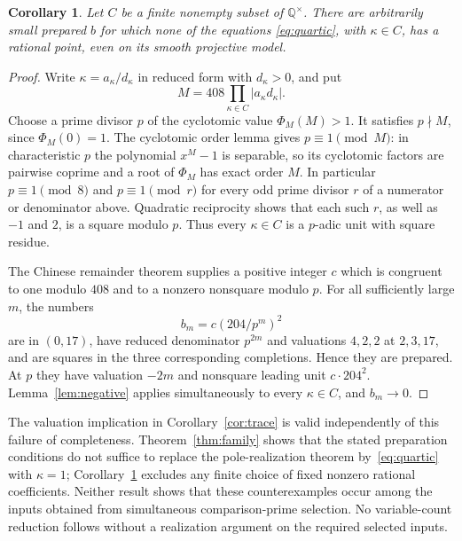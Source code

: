 \documentclass[11pt,a4paper]{article}
\newtheorem{corollary}[theorem]{Corollary}
\theoremstyle{definition}\newtheorem{definition}[theorem]{Definition}
\newcommand{\Q}{\mathbb Q}\newcommand{\Z}{\mathbb Z}
\begin{document}
\begin{corollary}\label{cor:finite}
Let $C$ be a finite nonempty subset of $\Q^\times$. There are
arbitrarily small prepared $b$ for which none of the equations
\eqref{eq:quartic}, with $\kappa\in C$, has a rational point,
even on its smooth projective model.
\end{corollary}
\begin{proof}
Write $\kappa=a_\kappa/d_\kappa$ in reduced form with
$d_\kappa>0$, and put
\[
             M=408\prod_{\kappa\in C}|a_\kappa d_\kappa|.
\]
Choose a prime divisor $p$ of the cyclotomic value $\Phi_M(M)>1$.
It satisfies $p\nmid M$, since $\Phi_M(0)=1$. The cyclotomic
order lemma gives $p\equiv1\pmod M$: in characteristic $p$
the polynomial $x^M-1$ is separable, so its cyclotomic factors
are pairwise coprime and a root of $\Phi_M$ has exact order $M$.
In particular $p\equiv1\pmod8$ and $p\equiv1\pmod r$ for
every odd prime divisor $r$ of a numerator or denominator above.
Quadratic reciprocity shows that each such $r$, as well as
$-1$ and $2$, is a square modulo $p$. Thus every $\kappa\in C$
is a $p$-adic unit with square residue.

The Chinese remainder theorem supplies a positive integer $c$
which is congruent to one modulo $408$ and to a nonzero
nonsquare modulo $p$. For all sufficiently large $m$, the numbers
\[
                         b_m=c(204/p^m)^2
\]
are in $(0,17)$, have reduced denominator $p^{2m}$ and
valuations $4,2,2$ at $2,3,17$, and are squares in the three
corresponding completions. Hence they are prepared. At $p$
they have valuation $-2m$ and nonsquare leading unit
$c\cdot204^2$. Lemma~\ref{lem:negative} applies simultaneously
to every $\kappa\in C$, and $b_m\to0$.
\end{proof}

The valuation implication in Corollary~\ref{cor:trace} is valid
independently of this failure of completeness. Theorem~\ref{thm:family}
shows that the stated preparation conditions do not suffice to
replace the pole-realization theorem by~\eqref{eq:quartic} with
$\kappa=1$; Corollary~\ref{cor:finite} excludes any finite choice
of fixed nonzero rational coefficients. Neither result shows that
these counterexamples occur
among the inputs obtained from simultaneous comparison-prime
selection. No variable-count reduction follows without a realization
argument on the required selected inputs.
\end{document}
